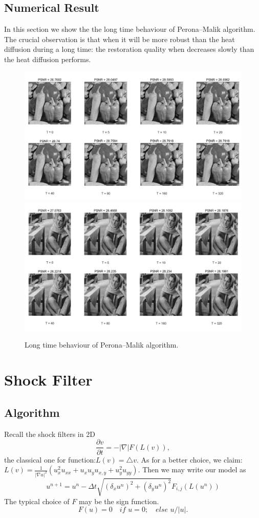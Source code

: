 \documentclass{article}
\begin{document}
\subsection{Numerical Result}
In this section we show the the long time behaviour of Perona--Malik algorithm. The crucial observation is that when it will be more robust than the heat diffusion during a long time: the restoration quality when decreases slowly than the heat diffusion performs.
\begin{figure}[H]
\begin{center}
\includegraphics[scale=.38]{3.png}
\includegraphics[scale=.38]{4.png}
\end{center}
\caption{Long time behaviour of Perona--Malik algorithm.}
\end{figure}

\section{Shock Filter}

\subsection{Algorithm}
Recall the shock filters in 2D
$$\frac{\partial v}{\partial t} = -|\nabla|F(L(v)),$$
the classical one for function:$L(v) = \triangle v$. 
As for a better choice, we claim:$L(v) = \frac{1}{{|\nabla u|}^2}(u_x^2 u_{xx}+u_x u_y u_{x,y} + u_y^2 u_{yy})$. 
Then we may write our model as
$$u^{n+1} = u^n  - \Delta t \sqrt{(\delta_x u^n)^2 + (\delta_y u^n)^2}F_{i,j}(L(u^n))$$
The typical choice of $F$ may be the sign function. $$F(u) = 0 \quad if \,\, u =0;\quad else \,\, u/|u|.$$
\end{document}
